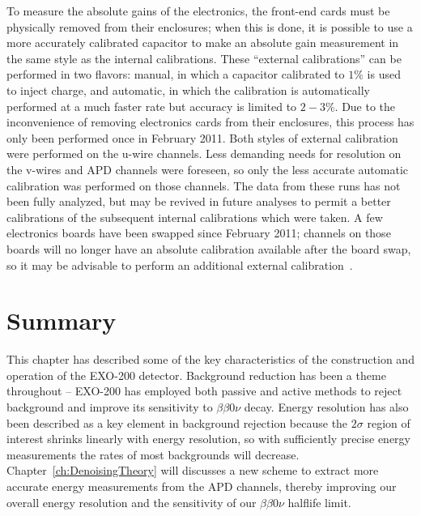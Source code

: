 To measure the absolute gains of the electronics, the front-end cards must be physically removed from their enclosures; when this is done, it is possible to use a more accurately calibrated capacitor to make an absolute gain measurement in the same style as the internal calibrations.  These ``external calibrations'' can be performed in two flavors: manual, in which a capacitor calibrated to $1\%$ is used to inject charge, and automatic, in which the calibration is automatically performed at a much faster rate but accuracy is limited to $2-3\%$.  Due to the inconvenience of removing electronics cards from their enclosures, this process has only been performed once in February 2011.  Both styles of external calibration were performed on the u-wire channels.  Less demanding needs for resolution on the v-wires and APD channels were foreseen, so only the less accurate automatic calibration was performed on those channels.  The data from these runs has not been fully analyzed, but may be revived in future analyses to permit a better calibrations of the subsequent internal calibrations which were taken.  A few electronics boards have been swapped since February 2011; channels on those boards will no longer have an absolute calibration available after the board swap, so it may be advisable to perform an additional external calibration~\cite{EnergyDocumentRun2a}.

\section{Summary}

This chapter has described some of the key characteristics of the construction and operation of the EXO-200 detector.  Background reduction has been a theme throughout -- EXO-200 has employed both passive and active methods to reject background and improve its sensitivity to $\beta\beta 0\nu$ decay.  Energy resolution has also been described as a key element in background rejection because the $2\sigma$ region of interest shrinks linearly with energy resolution, so with sufficiently precise energy measurements the rates of most backgrounds will decrease.  Chapter~\ref{ch:DenoisingTheory} will discusses a new scheme to extract more accurate energy measurements from the APD channels, thereby improving our overall energy resolution and the sensitivity of our $\beta\beta 0\nu$ halflife limit.
